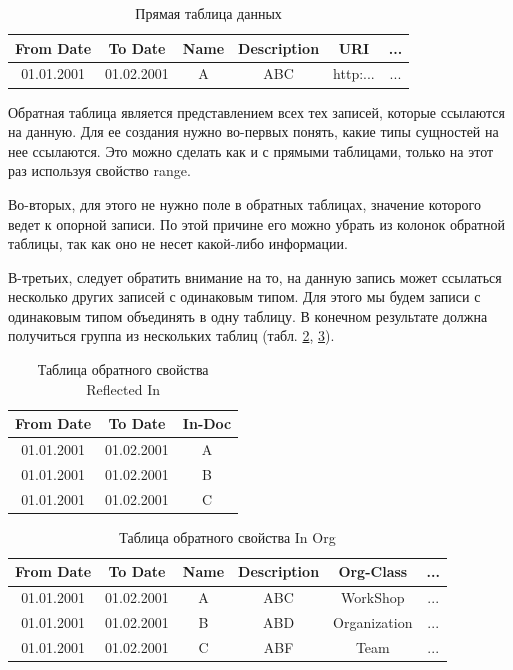 \documentclass[12pt]{article}
\begin{document}
\begin{table}[!ht]
    \centering
    \begin{tabular}{ | c | c | c | c | c | c | }
        \hline
        From Date  & To Date    & Name & Description & URI      & ... \\
        \hline
        01.01.2001 & 01.02.2001 & A    & ABC         & http:... & ... \\
        \hline
    \end{tabular}
    \caption{Прямая таблица данных}
    \label{tbl:dir_table}
\end{table}

Обратная таблица является представлением всех тех записей, которые ссылаются на данную. Для ее создания нужно во-первых понять, какие типы сущностей на нее ссылаются. Это можно сделать как и с прямыми таблицами, только на этот раз используя свойство range.

Во-вторых, для этого не нужно поле в обратных таблицах, значение которого ведет к опорной записи. По этой причине его можно убрать из колонок обратной таблицы, так как оно не несет какой-либо информации.

В-третьих, следует обратить внимание на то, на данную запись может ссылаться несколько других записей с одинаковым типом. Для этого мы будем записи с одинаковым типом объединять в одну таблицу. В конечном результате должна получиться группа из нескольких таблиц (табл. \ref{tbl:inv_tables_a}, \ref{tbl:inv_tables_b}).

\begin{table}
    \centering
    \begin{tabular}{ | c | c | c | }
        \hline
        From Date  & To Date    & In-Doc \\
        \hline
        01.01.2001 & 01.02.2001 & A      \\
        \hline
        01.01.2001 & 01.02.2001 & B      \\
        \hline
        01.01.2001 & 01.02.2001 & C      \\
        \hline
    \end{tabular}
    \caption{Таблица обратного свойства Reflected In}
    \label{tbl:inv_tables_a}
\end{table}

\begin{table}
    \centering
    \begin{tabular}{ | c | c | c | c | c | c | }
        \hline
        From Date  & To Date    & Name & Description & Org-Class    & ... \\
        \hline
        01.01.2001 & 01.02.2001 & A    & ABC         & WorkShop     & ... \\
        \hline
        01.01.2001 & 01.02.2001 & B    & ABD         & Organization & ... \\
        \hline
        01.01.2001 & 01.02.2001 & C    & ABF         & Team         & ... \\
        \hline
    \end{tabular}
    \caption{Таблица обратного свойства In Org}
    \label{tbl:inv_tables_b}
\end{table}
\end{document}
